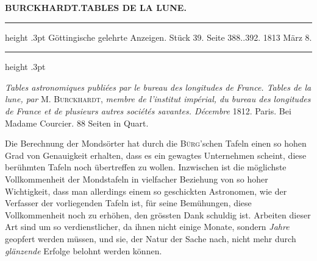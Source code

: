 \clearpage
\thispagestyle{empty}
\noindent{}%
\makebox[12mm][l]{}%
\parbox[t]{\dimexpr\linewidth-24mm\relax}{\centering\footnotesize\bfseries BURCKHARDT.\enspace TABLES DE LA LUNE.\par}%
\par\medskip
\begin{center}
\parbox{.83\linewidth}{%
\centering\small
\hrule height .3pt\relax\vspace{2.5pt}
Göttingische gelehrte Anzeigen. Stück 39. Seite 388..392. 1813 März 8.\par
\vspace{2.5pt}\hrule height .3pt\relax
}
\end{center}

\emph{Tables astronomiques publiées par le bureau des longitudes de France. Tables de la lune, par} M. \textsc{Burckhardt}, \emph{membre de l'institut impérial, du bureau des longitudes de France et de plusieurs autres sociétés savantes. Décembre} 1812. Paris. Bei Madame Courcier. 88 Seiten in Quart.

Die Berechnung der Mondsörter hat durch die \textsc{Bürg}'schen Tafeln einen so hohen Grad von Genauigkeit erhalten, dass es ein gewagtes Unternehmen scheint, diese berühmten Tafeln noch übertreffen zu wollen. Inzwischen ist die möglichste Vollkommenheit der Mondstafeln in vielfacher Beziehung von so hoher Wichtigkeit, dass man allerdings einem so geschickten Astronomen, wie der Verfasser der vorliegenden Tafeln ist, für seine Bemühungen, diese Vollkommenheit noch zu erhöhen, den grössten Dank schuldig ist. Arbeiten dieser Art sind um so verdienstlicher, da ihnen nicht einige Monate, sondern \emph{Jahre} geopfert werden müssen, und sie, der Natur der Sache nach, nicht mehr durch \emph{glänzende} Erfolge belohnt werden können.

